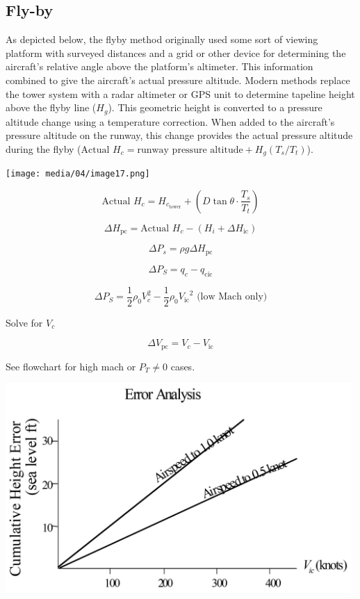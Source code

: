 \documentclass[
]{book}
\begin{document}
\hypertarget{fly-by}{%
\subsection{Fly-by}\label{fly-by}}

As depicted below, the flyby method originally used some sort of viewing platform with surveyed distances and a grid or other device for determining the aircraft's relative angle above the platform's altimeter. This information combined to give the aircraft's actual pressure altitude. Modern methods replace the tower system with a radar altimeter or GPS unit to determine tapeline height above the flyby line (\(H_g\)). This geometric height is converted to a pressure altitude change using a temperature correction. When added to the aircraft's pressure altitude on the runway, this change provides the actual pressure altitude during the flyby (\(\textrm{Actual } H_c = \textrm{runway pressure altitude} + H_g (T_s/T_t)\)).

\texttt{[image: media/04/image17.png]}

\[\text{Actual } H_{c} = H_{c_{\mathrm{tower}}} + \left( D\tan\theta \cdot \frac{T_{s}}{T_{t}} \right) \]

\[ \Delta H_{\mathrm{pc}} = \text{Actual } H_c - \left( H_i + \Delta H_{\mathrm{ic}} \right) \]

\[ \Delta P_s = \rho g \Delta H_{\mathrm{pc}} \]

\[ \Delta P_{S} = q_{c} - q_{\mathrm{cic}} \]

\[ \Delta P_{S} = \frac{1}{2}\rho_{0}{V_{c}^{2} - \frac{1}{2}\rho_{0}{V_{\mathrm{ic}}}^{2} \text{ (low Mach only)}} \]

Solve for \(V_c\)

\[ \Delta V_{\mathrm{pc}} = V_c - V_{\mathrm{ic}} \]

See flowchart for high mach or \(P_T \ne 0\) cases.

\includegraphics[width=5.1875in,height=3.15in]{media/04/image18.png}
\end{document}
